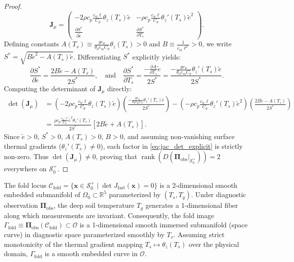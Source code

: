\begin{proof}
\begin{equation}
\mathbf{J}_{\mu} =
\begin{pmatrix}
-2 \rho c_p \frac{c_w \ell}{C_\theta} \theta_z(T_s) \tilde e & -\rho c_p \frac{c_w \ell}{C_\theta} \theta_z'(T_s) \tilde e^2 \\[6pt]
\frac{\partial S^*}{\partial \tilde e} & \frac{\partial S^*}{\partial T_s}
\end{pmatrix}.
\end{equation}
Defining constants $A(T_s) \equiv \frac{g c_w}{\theta_0 c_m C_\theta} \theta_z(T_s) > 0$ and $B \equiv \frac{1}{c_m \ell^2} > 0$, we write $S^* = \sqrt{B \tilde e^2 - A(T_s) \tilde e}$. Differentiating $S^*$ explicitly yields:
\begin{equation}
\frac{\partial S^*}{\partial \tilde e} = \frac{2 B \tilde e - A(T_s)}{2 S^*}, \quad \text{and} \quad \frac{\partial S^*}{\partial T_s} = \frac{-\frac{\partial A}{\partial T_s} \tilde e}{2 S^*} = \frac{-\frac{g c_w}{\theta_0 c_m C_\theta} \theta_z'(T_s) \tilde e}{2 S^*}.
\end{equation}
Computing the determinant of $\mathbf{J}_{\mu}$ directly:
\begin{align}
\det(\mathbf{J}_{\mu}) &= \left(-2 \rho c_p \frac{c_w \ell}{C_\theta} \theta_z(T_s) \tilde e\right) \left( \frac{-\frac{g c_w}{\theta_0 c_m C_\theta} \theta_z'(T_s) \tilde e}{2 S^*} \right) - \left(-\rho c_p \frac{c_w \ell}{C_\theta} \theta_z'(T_s) \tilde e^2\right) \left( \frac{2 B \tilde e - A(T_s)}{2 S^*}\right) \nonumber \\
&= \frac{\rho c_p \frac{c_w \ell}{C_\theta} \tilde e^2 \theta_z'(T_s)}{2 S^*} \left[ 2 B \tilde e + A(T_s) \right].
\label{eq:jac_det_explicit}
\end{align}
Since $\tilde e > 0$, $S^* > 0$, $A(T_s) > 0$, $B > 0$, and assuming non-vanishing surface thermal gradients ($\theta_z'(T_s) \neq 0$), each factor in \eqref{eq:jac_det_explicit} is strictly non-zero. Thus $\det(\mathbf{J}_{\mu}) \neq 0$, proving that $\operatorname{rank}\left(D\left(\boldsymbol{\Pi}_{\mathrm{obs}}\vert_{\mathcal{S}_0^+}\right)\right) = 2$ everywhere on $\mathcal{S}_0^+$.
\end{proof}

\begin{corollary}
\label{cor:fold_image}
The fold locus $\mathcal{C}_{\mathrm{fold}} = \{\mathbf{x} \in \mathcal{S}_0^+ \mid \det J_{\mathrm{fast}}(\mathbf{x}) = 0\}$ is a 2-dimensional smooth embedded submanifold of $\Omega_0 \subset \mathbb{R}^5$ parameterized by $(T_s, T_g)$. Under diagnostic observation $\boldsymbol{\Pi}_{\mathrm{obs}}$, the deep soil temperature $T_g$ generates a 1-dimensional fiber along which measurements are invariant. Consequently, the fold image $\Gamma_{\mathrm{fold}} \equiv \boldsymbol{\Pi}_{\mathrm{obs}}(\mathcal{C}_{\mathrm{fold}}) \subset \mathcal{O}$ is a 1-dimensional smooth immersed submanifold (space curve) in diagnostic space parameterized smoothly by $T_s$. Assuming strict monotonicity of the thermal gradient mapping $T_s \mapsto \theta_z(T_s)$ over the physical domain, $\Gamma_{\mathrm{fold}}$ is a smooth embedded curve in $\mathcal{O}$.
\end{corollary}

